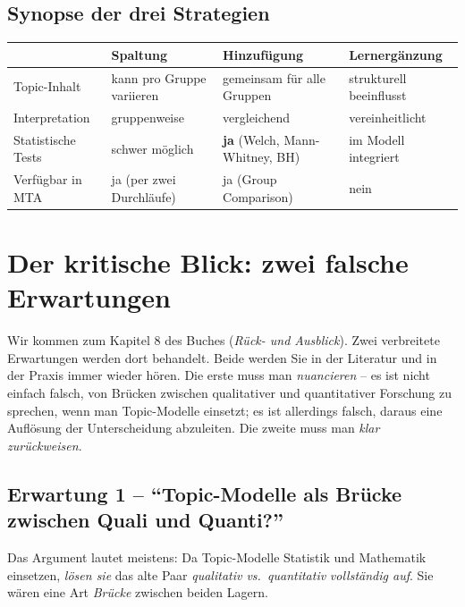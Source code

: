 \documentclass[a4paper,11pt]{article}
\begin{document}
\subsection{Synopse der drei Strategien}

\smallskip

\footnotesize
\begin{tabularx}{\textwidth}{@{}p{}XXX@{}}
\toprule
& \textbf{Spaltung} & \textbf{Hinzufügung} & \textbf{Lernergänzung} \\
\midrule
Topic-Inhalt
  & kann pro Gruppe variieren
  & gemeinsam für alle Gruppen
  & strukturell beeinflusst \\
\addlinespace[3pt]
Interpretation
  & gruppenweise
  & vergleichend
  & vereinheitlicht \\
\addlinespace[3pt]
Statistische Tests
  & schwer möglich
  & \textbf{ja} (Welch, Mann-Whitney, BH)
  & im Modell integriert \\
\addlinespace[3pt]
Verfügbar in MTA
  & ja (per zwei Durchläufe)
  & ja (Group Comparison)
  & nein \\
\bottomrule
\end{tabularx}
\normalsize

\section{Der kritische Blick: zwei falsche Erwartungen}

Wir kommen zum Kapitel 8 des Buches (\emph{Rück- und Ausblick}). Zwei
verbreitete Erwartungen werden dort behandelt. Beide werden Sie in der
Literatur und in der Praxis immer wieder hören. Die erste muss man
\emph{nuancieren} – es ist nicht einfach falsch, von Brücken zwischen
qualitativer und quantitativer Forschung zu sprechen, wenn man Topic-Modelle
einsetzt; es ist allerdings falsch, daraus eine Auflösung der Unterscheidung
abzuleiten. Die zweite muss man \emph{klar zurückweisen}.

\subsection{Erwartung 1 -- \enquote{Topic-Modelle als Brücke zwischen
Quali und Quanti?}}

Das Argument lautet meistens: Da Topic-Modelle Statistik und Mathematik
einsetzen, \emph{lösen sie} das alte Paar \emph{qualitativ vs.\
quantitativ} \emph{vollständig auf}. Sie wären eine Art \emph{Brücke}
zwischen beiden Lagern.
\end{document}
